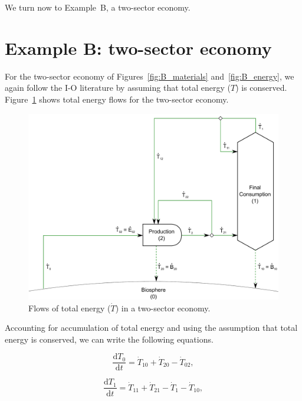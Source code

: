 We turn now to Example~B, a two-sector economy.


\section{Example B: two-sector economy} %
\label{sec:Embodied_Energy_Example_B}

For the two-sector economy of Figures~\ref{fig:B_materials}
and~\ref{fig:B_energy}, we again follow the I-O literature 
by assuming that total energy ($T$) is conserved. 
Figure~\ref{fig:B_total_energy} shows total energy
flows for the two-sector economy.

\begin{figure}[!ht]
\includegraphics[width=0.9\linewidth]{Part_1/Chapter_Embodied/images/2_sector_embodied_energy.pdf}
\caption[Flows of total energy in a two-sector economy.]{Flows of total energy ($\dot{T}$) in a two-sector economy.}
\label{fig:B_total_energy}
\end{figure}

Accounting for accumulation of total energy and using the assumption 
that total energy is conserved, we can write the following equations.

\begin{equation} \label{eq:CV_T_0}
	\frac{\mathrm{d}T_{0}}{\mathrm{d}t} 	 
	= \dot{T}_{10} 
	+ \dot{T}_{20} 
	- \dot{T}_{02},
\end{equation}

\begin{equation} \label{eq:CV_T_1}
	\frac{\mathrm{d}T_{1}}{\mathrm{d}t} 	 
	= \dot{T}_{11}
	+ \dot{T}_{21} 
	- \dot{T}_{1}
	- \dot{T}_{10},
\end{equation}

